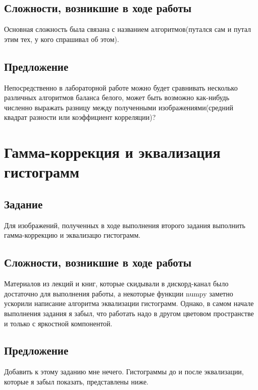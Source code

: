 \documentclass[a4paper,14pt]{extarticle} %
\begin{document}
\subsection{Сложности, возникшие в ходе работы}
Основная сложность была связана с названием алгоритмов(путался сам и путал этим тех, у кого спрашивал об этом).\\

\subsection{Предложение}
Непосредственно в лабораторной работе можно будет сравнивать несколько различных алгоритмов баланса белого, может быть возможно как-нибудь численно выражать разницу между полученными изображениями(средний квадрат разности или коэффициент корреляции)?\\

\pagebreak

\section{Гамма-коррекция и эквализация гистограмм}

\subsection{Задание}
Для изображений, полученных в ходе выполнения второго задания выполнить гамма-коррекцию и эквализацю гистограмм. 

\subsection{Сложности, возникшие в ходе работы}
Материалов из лекций и книг, которые скидывали в дискорд-канал было достаточно для выполнения работы, а некоторые функции numpy заметно ускорили написание алгоритма эквализации гистограмм. Однако, в самом начале выполнения задания я забыл, что работать надо в другом цветовом пространстве и только с яркостной компонентой. 

\subsection{Предложение}
Добавить к этому заданию мне нечего. Гистограммы до и после эквализации, которые я забыл показать, представлены ниже.\\
\end{document}
